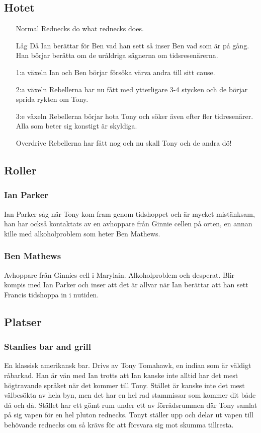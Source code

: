 \subsection{Hotet}
\begin{itemize}
  \item[Normal] Rednecks do what rednecks does.
  \item[Låg] Då Ian berättar för Ben vad han sett så inser Ben vad som är på gång. Han börjar berätta om de uråldriga sägnerna om tidsresenärerna.
  \item[1:a växeln] Ian och Ben börjar försöka värva andra till sitt cause.
  \item[2:a växeln] Rebellerna har nu fått med ytterligare 3-4 stycken och de börjar sprida rykten om Tony.
  \item[3:e växeln] Rebellerna börjar hota Tony och söker även efter fler tidresenärer. Alla som beter sig konstigt är skyldiga.
  \item[Overdrive] Rebellerna har fått nog och nu skall Tony och de andra dö!
\end{itemize}
\subsection{Roller}
\subsubsection{Ian Parker}
Ian Parker såg när Tony kom fram genom tidshoppet och är mycket mistänksam, han har också kontaktats av en avhoppare från Ginnie cellen på orten, en annan kille med alkoholproblem som heter Ben Mathews.
\subsubsection{Ben Mathews}
Avhoppare från Ginnies cell i Marylain. Alkoholproblem och desperat. Blir kompis med Ian Parker och inser att det är allvar när Ian berättar att han sett Francis tidshoppa in i nutiden.
\subsection{Platser}
\subsubsection{Stanlies bar and grill}
En klassisk amerikansk bar. Drivs av Tony Tomahawk, en indian som är väldigt råbarkad. Han är vän med Ian trotts att Ian kanske inte alltid har det mest högtravande språket när det kommer till Tony. Stället är kanske inte det mest välbesökta av hela byn, men det har en hel rad stammissar som kommer dit både då och då. Stället har ett gömt rum under ett av förrådsrummen där Tony samlat på sig vapen för en hel pluton rednecks. Tonyt ställer upp och delar ut vapen till behövande rednecks om så krävs för att försvara sig mot skumma tillresta.
